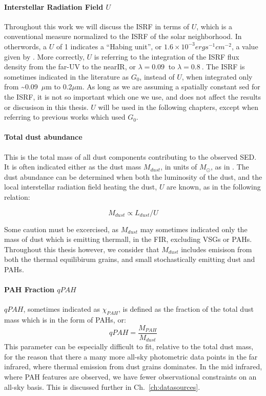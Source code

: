       \paragraph{Interstellar Radiation Field $U$}
        Throughout this work we will discuss the ISRF in terms of $U$, which is a conventional measure normalized to the ISRF of the solar neighborhood. In otherwords, a $U$ of 1 indicates a ``Habing unit'', or $1.6\times{}10^{-3} erg s^{-1} cm^{-2}$, a value given by \cite{habing68}. More correctly, $U$ is referring to the integration of the ISRF flux density from the far-UV to the nearIR, or $\lambda =0.09~$ to $\lambda =0.8~$.  The ISRF is sometimes indicated in the literature as $G_0$, instead of $U$, when integrated only from \textasciitilde{}0.09~$\mu$m to 0.2$\mu$m. As long as we are assuming a spatially constant \gls{sed} for the ISRF, it is not so important which one we use, and does not affect the results or discusison in this thesis. $U$ will be used in the following chapters, except when referring to previous works which used $G_0$.

      \paragraph{Total dust abundance}
         This is the total mass of all dust components contributing to the observed SED. It is often indicated either as the dust mass $M_{dust}$, in units of $M_{\odot}$, as in \cite{galliano08a}. The dust abundance can be determined when both the luminosity of the dust, and the local interstellar radiation field heating the dust, $U$ are known, as in the following relation:

           \begin{equation}
            M_{dust} \propto L_{dust}/U
           \end{equation}

          Some caution must be excercised, as $M_{dust}$ may sometimes indicated only the mass of dust which is emitting thermall, in the FIR, excluding VSGs or PAHs. Throughout this thesis however, we consider that $M_{dust}$ includes emisison from both the thermal equilibirum grains, and small stochastically emitting dust and PAHs.

      \paragraph{PAH Fraction $qPAH$}
        $qPAH$, sometimes indicated as $\chi_{PAH}$, is defined as the fraction of the total dust mass which is in the form of PAHs, or:
        \begin{equation}
          qPAH = \frac{M_{PAH}}{M_{dust}}
        \end{equation}
        This parameter can be especially difficult to fit, relative to the total dust mass, for the reason that there a many more all-sky photometric data points in the far infrared, where thermal emission from dust grains dominates. In the mid infrared, where PAH features are observed, we have fewer observational constraints on an all-sky basis. This is discussed further in Ch.~\ref{ch:datasources}.

